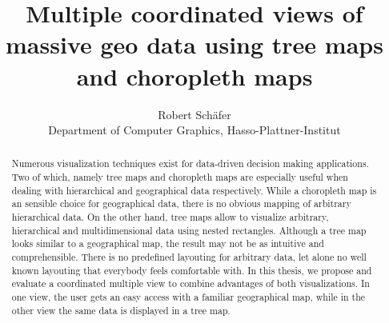 \documentclass{article}
\begin{document}
\title{Multiple coordinated views of massive geo data using tree maps and choropleth maps}
\author{Robert Schäfer\\ Department of Computer Graphics, Hasso-Plattner-Institut}
\maketitle

\newcommand{\rufu}{Rundfunk \textsc{mitbestimmen}}
\newcommand\hmm[1]{\ifnum\ifhmode\spacefactor\else2000\fi>1000 \uppercase{#1}\else#1\fi}
\newcommand{\cmv}{\hmm{c}oordinated multiple view}
\newcommand{\cmvs}{\hmm{c}oordinated multiple views}

\begin{abstract}
  Numerous visualization techniques exist for data-driven decision making applications.
  Two of which, namely tree maps and choropleth maps are especially useful when dealing with hierarchical and geographical data respectively.
  While a choropleth map is an sensible choice for geographical data, there is no obvious mapping of arbitrary hierarchical data.
  On the other hand, tree maps allow to visualize arbitrary, hierarchical and multidimensional data using nested rectangles.
  Although a tree map looks similar to a geographical map, the result may not be as intuitive and comprehensible.
  There is no predefined layouting for arbitrary data, let alone no well known layouting that everybody feels comfortable with.
  In this thesis, we propose and evaluate a coordinated multiple view to combine advantages of both visualizations.
  In one view, the user gets an easy access with a familiar geographical map, while in the other view the same data is displayed in a tree map.
\end{abstract}
\end{document}
